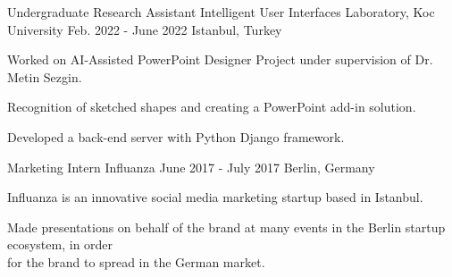 \begin{cventries}
  \cventry
    {Undergraduate Research Assistant}
    {Intelligent User Interfaces Laboratory, Koc University}
    {Feb. 2022 - June 2022}
    {Istanbul, Turkey}
    {
      \begin{cvitems}
        \item {Worked on AI-Assisted PowerPoint Designer Project under supervision of Dr. Metin Sezgin.}
        \item {Recognition of sketched shapes and creating a PowerPoint add-in solution.}
        \item {Developed a back-end server with Python Django framework.}
      \end{cvitems}
    }

  \cventry
    {Marketing Intern}
    {Influanza}
    {June 2017 - July 2017}
    {Berlin, Germany}
    {
      \begin{cvitems}
        \item {Influanza is an innovative social media marketing startup based in Istanbul.}
        \item {Made presentations on behalf of the brand at many events in the Berlin startup ecosystem, in order \\ for the brand to spread in the German market.}
      \end{cvitems}
    }


\end{cventries}
